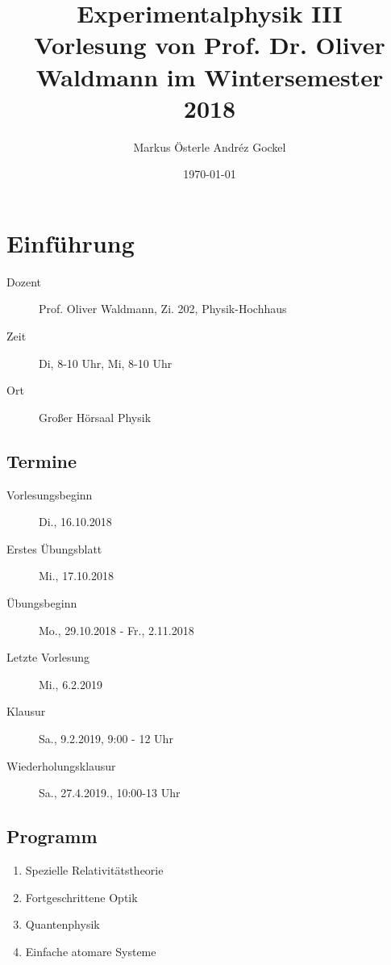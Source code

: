 \documentclass[titlepage,11pt,a4paper,ngerman]{report}
\begin{document}
	

\title{
	{\Huge Experimentalphysik III}\\[1em]
	{\Large Vorlesung von Prof. Dr. Oliver Waldmann im Wintersemester 2018}}
\author{Markus Österle \hspace{5pt} Andréz Gockel}
\date{ \today}%
\maketitle
\tableofcontents

\setcounter{chapter}{-1}
\chapter{Einführung}

\begin{description}
	\item[Dozent] Prof. Oliver Waldmann, Zi. 202, Physik-Hochhaus
	\item[Zeit] Di, 8-10 Uhr, Mi, 8-10 Uhr
	\item[Ort] Großer Hörsaal Physik
 \end{description}

\section{Termine}
\begin{description}
	\item[Vorlesungsbeginn] Di., 16.10.2018
	\item[Erstes Übungsblatt] Mi., 17.10.2018
	\item[Übungsbeginn] Mo., 29.10.2018 - Fr., 2.11.2018
	\item[Letzte Vorlesung] Mi., 6.2.2019
	\item[Klausur] Sa., 9.2.2019, 9:00 - 12 Uhr
	\item[Wiederholungsklausur]	Sa., 27.4.2019., 10:00-13 Uhr
\end{description}

\section{Programm}
\begin{enumerate}
	\item Spezielle Relativitätstheorie
	\item Fortgeschrittene Optik
	\item Quantenphysik
	\item Einfache atomare Systeme
\end{enumerate}
\end{document}
